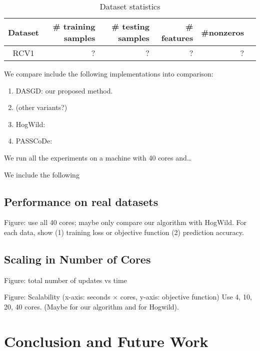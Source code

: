 \documentclass{sig-alternate-2013}
\newcommand{\0}{\boldsymbol{0}}
\def\DASGD{{DASGD}\xspace}
\def\Hogwild{{HogWild}\xspace}
\def\PASSCODE{{PASSCoDe}\xspace}
\begin{document}
\begin{table*}
  \centering
  \caption{Dataset statistics \label{tab:datasets}}
  \begin{tabular}{|c|r|r|r|r|r|} \hline
    Dataset & \# training samples & \# testing samples & \# features &  \#nonzeros\\ 
    \hline
    RCV1 & ? & ? & ? & ?\\ 
    \hline
  \end{tabular}
\end{table*}

We compare include the following implementations into comparison: 
\begin{enumerate}
  \item \DASGD: our proposed method. 
  \item (other variants?)
  \item \Hogwild:
  \item \PASSCODE: 
  \end{enumerate}

We run all the experiments on a machine with 40 cores and\dots 

We include the following

\subsection{Performance on real datasets}

Figure: use all 40 cores; maybe only compare our algorithm with HogWild. 
For each data, show (1) training loss or objective function (2) prediction accuracy. 


\subsection{Scaling in Number of Cores}

Figure: total number of updates vs time

Figure: Scalability (x-axis: seconds $\times$ cores, y-axis: objective function)
Use 4, 10, 20, 40 cores. 
(Maybe for our algorithm and for Hogwild). 


\section{Conclusion and Future Work}
\label{sec:conclusion}


\newpage


\end{document}
